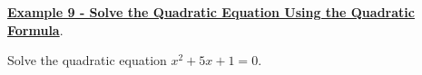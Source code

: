 \documentclass[12pt]{book}
\newcommand{\D}{\displaystyle}
\begin{document}
\newpage

\underline{\textbf{Example 9 - Solve the Quadratic Equation Using the Quadratic Formula}}.

Solve the quadratic equation $x^2+5x+1=0$.

\vspace{60mm}

\begin{comment}
    {\large \textbf{The Discriminant}}
The quadratic formula not only gives us solutions, but it also tells us the nature of the solutions when we focus on what's under the square root: $b^2-4ac$. 

\begin{boxR}
    \textbf{The Discriminant}
    \vspace{1mm}
    \hline
    \vspace{2mm}
    The \textbf{discriminant} of $ax^2 +bx+c = 0$ is $$b^2-4ac$$ which is the expression under the square root in the quadratic formula:
    
    $\D x = \frac{-b \pm \sqrt{b^2-4ac}}{2a}$
\end{boxR}
\end{comment}
\end{document}
